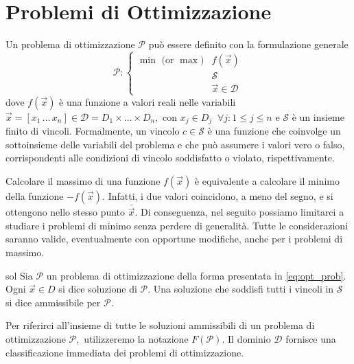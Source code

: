 \section{Problemi di Ottimizzazione}

Un problema di ottimizzazione \( \mathcal{P} \) può essere definito con la formulazione generale
\begin{equation}\label{eq:opt_prob}
    \mathcal{P}\colon
    \begin{cases}
        \text{$\min$ (or $\max$)} & f(\vec{x}) \\
                                  & \mathcal{S} \\
                                  & \vec{x} \in \mathcal{D}
    \end{cases}
\end{equation}
dove
\(
    f(\vec{x})
\)
è una funzione a valori reali nelle variabili
\(
    \vec{x} = [x_1 \, \ldots \, x_n] \in \mathcal{D} = D_1 \times \dots \times D_n,
\)
con
\(
    x_j \in D_j \;\; \forall j \colon 1 \leq j \leq n
\)
e
\(
    \mathcal{S}
\)
è un insieme finito di vincoli. Formalmente, un vincolo
\(
    c \in \mathcal{S}
\)
è una funzione che coinvolge un sottoinsieme delle variabili del problema e che può assumere i valori vero o falso,
corrispondenti alle condizioni di vincolo soddisfatto o violato, rispettivamente.

Calcolare il massimo di una funzione
\(
    f(\vec{x})
\)
è equivalente a calcolare il minimo della funzione
\(
    -f(\vec{x})
\). Infatti, i due valori coincidono, a meno del segno, e si ottengono nello stesso punto
\(
    \bar{\vec{x}}
\).
Di conseguenza, nel seguito possiamo limitarci a studiare i problemi di minimo senza perdere di generalità. Tutte le
considerazioni saranno valide, eventualmente con opportune modifiche, anche per i problemi di massimo.
\begin{defbox}{}{sol}
    Sia \( \mathcal{P} \) un problema di ottimizzazione della forma presentata in \eqref{eq:opt_prob}. Ogni \( \vec{x}
    \in D \) si dice soluzione di \( \mathcal{P} \). Una soluzione che soddisfi tutti i vincoli in \( \mathcal{S} \) si
    dice ammissibile per \( \mathcal{P} \).
\end{defbox}
Per riferirci all'insieme di tutte le soluzioni ammissibili di un problema di ottimizzazione
\(
    \mathcal{P},
\)
utilizzeremo la notazione
\(
    F(\mathcal{P}).
\)
Il dominio \( \mathcal{D} \) fornisce una classificazione immediata dei problemi di ottimizzazione.

